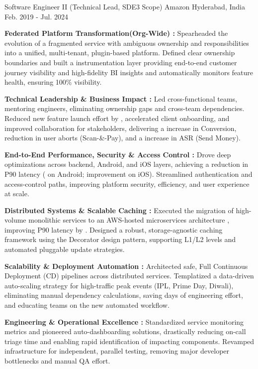 \begin{cventries}
	
    \cventry
    {Software Engineer II (Technical Lead, SDE3 Scope)} %
    {Amazon} %
    {Hyderabad, India} %
    {Feb. 2019 - Jul. 2024} %
    { 
		\begin{cvitems} %
    	    \item {\textbf{Federated Platform Transformation(Org-Wide) :} Spearheaded the evolution of a fragmented service with ambiguous ownership and responsibilities into a unified, multi-tenant, plugin-based platform. Defined clear ownership boundaries and built a  instrumentation layer providing end-to-end customer journey visibility and high-fidelity BI insights and automatically monitors feature health, ensuring 100\% visibility.}
			 \item{\textbf{Technical Leadership \& Business Impact :} Led  cross-functional teams, mentoring  engineers, eliminating ownership gaps and cross-team dependencies. Reduced new feature launch effort by , accelerated client onboarding, and improved collaboration for  stakeholders, delivering a  increase in Conversion,  reduction in user aborts (Scan-\&-Pay), and a  increase in ASR (Send Money).}
			\item{\textbf{End-to-End Performance, Security \& Access Control :} Drove deep optimizations across backend, Android, and iOS layers, achieving a  reduction in P90 latency ( \to {} on Android;  improvement on iOS). Streamlined authentication and access-control paths, improving platform security, efficiency, and user experience at scale.}
			\item{\textbf{Distributed Systems \& Scalable Caching :} Executed the migration of high-volume monolithic services to an AWS-hosted microservices architecture , improving P90 latency by . Designed a robust, storage-agnostic caching framework using the Decorator design pattern, supporting L1/L2 levels and automated pluggable update strategies. }
			\item{\textbf{Scalability \& Deployment Automation :} Architected safe, Full Continuous Deployment (CD) pipelines across distributed services. Templatized a data-driven auto-scaling strategy for high-traffic peak events (IPL, Prime Day, Diwali), eliminating manual dependency calculations, saving days of engineering effort, and educating teams on the new automated workflow.}
			\item{\textbf{Engineering \& Operational Excellence :} Standardized service monitoring metrics and pioneered auto-dashboarding solutions, drastically reducing on-call triage time and enabling rapid identification of impacting components. Revamped infrastructure for independent, parallel testing, removing major developer bottlenecks and manual QA effort.}

\end{cvitems}}
\end{cventries}

